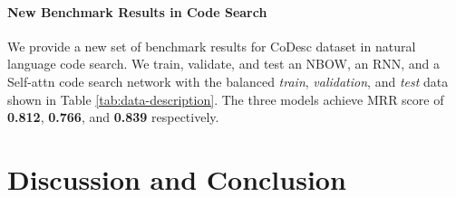 \documentclass[11pt,a4paper]{article}
\begin{document}
\begin{table}
\caption{MRR of individual datasets (Section \ref{subsec:data-sources}) before and after noise removal.}
\label{tab:ablation}
\vspace{-2mm}
\end{table}











\paragraph{New Benchmark Results in Code Search}
We provide a new set of benchmark results for CoDesc dataset in natural language code search. We train, validate, and test an NBOW, an RNN, and a Self-attn code search network with the balanced \textit{train}, \textit{validation}, and \textit{test} data shown in Table \ref{tab:data-description}. The three models achieve MRR score of \textbf{0.812}, \textbf{0.766}, and \textbf{0.839} respectively. 

 
\section{Discussion and Conclusion}
\label{sec:conclusion}
\end{document}
